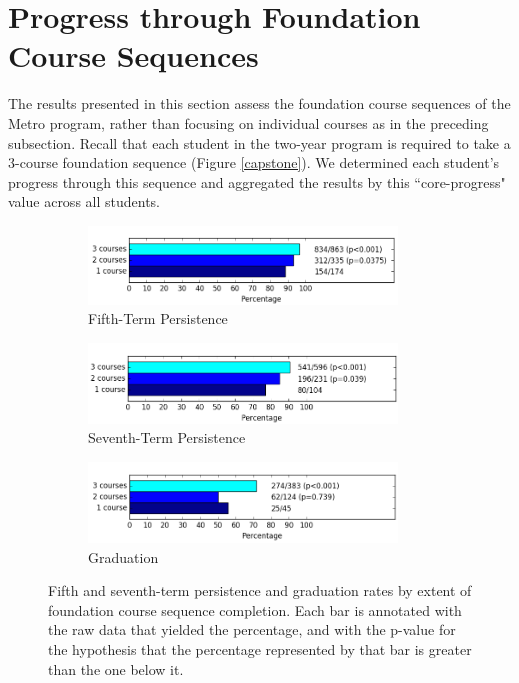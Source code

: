 \section{Progress through Foundation Course Sequences}
\label{results_prescribedpatterns}

The results presented in this section assess the foundation course sequences of the Metro program, rather than focusing on individual courses as in the preceding subsection. Recall that each student in the two-year program is required to take a 3-course foundation sequence (Figure \ref{capstone}).  We determined each student's progress through this sequence and aggregated the results by this ``core-progress" value across all students.

\begin{figure}[htbp]
    \centering
    \begin{subfigure}[b]{\textwidth}
    \centering
    \includegraphics[width=0.9\textwidth]{figures/pathways_fifthpers.png}
    \caption{Fifth-Term Persistence}
    \label{pathways_fifth}
    \vspace{6mm}
    \end{subfigure}
    \begin{subfigure}[b]{\textwidth}
    \centering
    \includegraphics[width=0.9\textwidth]{figures/pathways_seventhpers.png}
    \caption{Seventh-Term Persistence}
    \label{pathways_seventh}
    \vspace{6mm}
    \end{subfigure}
    \vspace{6mm}
    \begin{subfigure}[b]{\textwidth}
    \centering
    \includegraphics[width=0.9\textwidth]{figures/pathways_grad.png}
    \caption{Graduation}
    \label{pathways_grad}
    \end{subfigure}
\caption{Fifth and seventh-term persistence and graduation rates by extent of foundation course sequence completion.  Each bar is annotated with the raw data that yielded the percentage, and with the p-value for the hypothesis that the percentage represented by that bar is greater than the one below it.}
\label{core_pathway_outcomes}
\end{figure}


